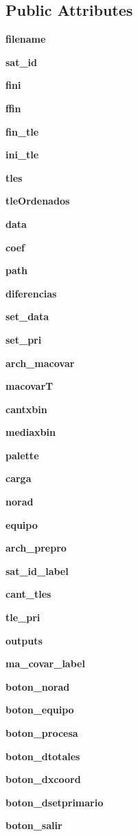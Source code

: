 \subsection*{\-Public \-Attributes}
\begin{DoxyCompactItemize}
\item 
{\bf filename}
\item 
{\bf sat\-\_\-id}
\item 
{\bf fini}
\item 
{\bf ffin}
\item 
{\bf fin\-\_\-tle}
\item 
{\bf ini\-\_\-tle}
\item 
{\bf tles}
\item 
{\bf tle\-Ordenados}
\item 
{\bf data}
\item 
{\bf coef}
\item 
{\bf path}
\item 
{\bf diferencias}
\item 
{\bf set\-\_\-data}
\item 
{\bf set\-\_\-pri}
\item 
{\bf arch\-\_\-macovar}
\item 
{\bf macovar\-T}
\item 
{\bf cantxbin}
\item 
{\bf mediaxbin}
\item 
{\bf palette}
\item 
{\bf carga}
\item 
{\bf norad}
\item 
{\bf equipo}
\item 
{\bf arch\-\_\-prepro}
\item 
{\bf sat\-\_\-id\-\_\-label}
\item 
{\bf cant\-\_\-tles}
\item 
{\bf tle\-\_\-pri}
\item 
{\bf outputs}
\item 
{\bf ma\-\_\-covar\-\_\-label}
\item 
{\bf boton\-\_\-norad}
\item 
{\bf boton\-\_\-equipo}
\item 
{\bf boton\-\_\-procesa}
\item 
{\bf boton\-\_\-dtotales}
\item 
{\bf boton\-\_\-dxcoord}
\item 
{\bf boton\-\_\-dsetprimario}
\item 
{\bf boton\-\_\-salir}
\item 

\end{DoxyCompactItemize}
